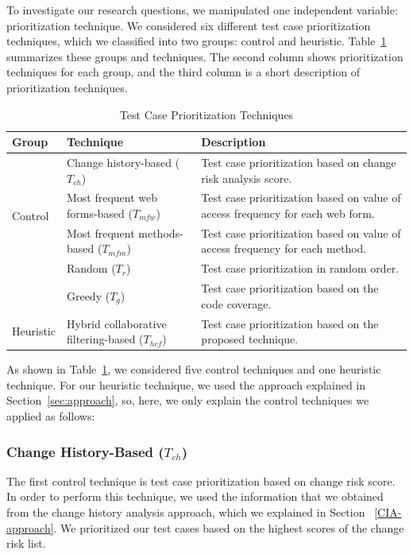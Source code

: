 To investigate our research questions, we manipulated one independent 
variable: prioritization technique. 
We considered six different test case prioritization techniques,
which we classified into two groups: control and heuristic.
Table~\ref{tab:techniques} summarizes these groups and techniques.
The second column shows prioritization techniques for each group, 
and the third column is a short description of prioritization techniques. 

\begin{table}[!ht]
\caption{Test Case Prioritization Techniques}
\vspace*{-10pt}
\begin{center}
\begin{tabular}{|l|l|l|}\hline
Group & Technique & Description \\ \hline
\multirow{4}{*}{Control} 
& Change history-based ($T_{ch}$) & Test case prioritization based on change risk analysis score.\\
& Most frequent web forms-based ($T_{mfw}$)&  Test case prioritization based on value of access frequency for each web form.\\
& Most frequent methods-based ($T_{mfm}$) &  Test case prioritization based on value of access frequency for each method.\\
& Random ($T_{r}$) &  Test case prioritization in random order.\\	
& Greedy ($T_{g}$) &  Test case prioritization based on the code coverage.\\\hline			
\multirow{1}{*}{Heuristic} 
& Hybrid collaborative filtering-based ($T_{hcf}$)& Test case prioritization based on the proposed technique. \\\hline
\end{tabular}
\end {center}
\label{tab:techniques}
\vspace*{-10pt}
\end{table}

As shown in Table~\ref{tab:techniques}, we considered five control techniques and 
one heuristic technique. For our heuristic technique, we used the approach 
explained in Section~\ref{sec:approach},
so, here, we only explain the control techniques we applied as follows:

\subsubsection*{Change History-Based ($T_{ch}$)}
The first control technique is test case prioritization based on change risk
score. In order to perform this technique, we used the information that
we obtained from the change history analysis approach, which we explained in 
Section ~\ref{CIA-approach}. We prioritized our test cases based on the 
highest scores of the change risk list. 
	
